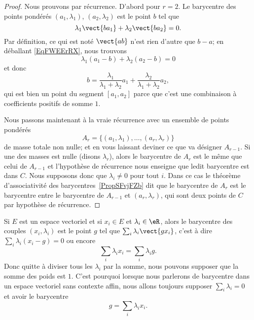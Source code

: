 \begin{proof}
    Nous prouvons par récurrence. D'abord pour \( r=2\). Le barycentre des points pondérés \( (a_1,\lambda_1)\), \( (a_2,\lambda_2)\) est le point \( b\) tel que
    \begin{equation}        \label{EqFWEErRX}
        \lambda_1\vect{ ba_1 }+\lambda_2\vect{ ba_2 }=0.
    \end{equation}
    Par définition, ce qui est noté \( \vect{ ab }\) n'est rien d'autre que \( b-a\); en déballant \eqref{EqFWEErRX}, nous trouvons
    \begin{equation}
        \lambda_1(a_1-b)+\lambda_2(a_2-b)=0
    \end{equation}
    et donc
    \begin{equation}
        b=\frac{ \lambda_1 }{ \lambda_1+\lambda_2 }a_1+\frac{ \lambda_2 }{ \lambda_1+\lambda_2 }a_2,
    \end{equation}
    qui est bien un point du segment \( [a_1,a_2]\) parce que c'est une combinaison à coefficients positifs de somme \( 1\).

    Nous passons maintenant à la vraie récurrence avec un ensemble de points pondérés
    \begin{equation}
        A_r=\{ (a_1,\lambda_1),\ldots, (a_r,\lambda_r) \}
    \end{equation}
    de masse totale non nulle; et en vous laissant deviner ce que va désigner \( A_{r-1}\). Si une des masses est nulle (disons \( \lambda_r\)), alors le barycentre de \( A_r\) est le même que celui de \( A_{r-1}\) et l'hypothèse de récurrence nous enseigne que ledit barycentre est dans \( C\). Nous supposons donc que \( \lambda_i\neq 0\) pour tout \( i\). Dans ce cas le théorème d'associativité des barycentres~\ref{PropSFvjFZb} dit que le barycentre de \( A_r\) est le barycentre entre le barycentre de \( A_{r-1}\) et \( (a_r,\lambda_r)\), qui sont deux points de \( C\) par hypothèse de récurrence.
\end{proof}

Si \( E\) est un espace vectoriel et si \( x_i\in E\) et \( \lambda_i\in \eR\), alors le barycentre des couples \( (x_i,\lambda_i)\) est le point \( g\) tel que \( \sum_i\lambda_i\vect{ gx_i }\), c'est à dire \( \sum_i\lambda_i(x_i-g)=0\) ou encore
\begin{equation}
    \sum_i\lambda_ix_i=\sum_i\lambda_ig.
\end{equation}
Donc quitte à diviser tous les \( \lambda_i\) par la somme, nous pouvons supposer que la somme des poids est \( 1\). C'est pourquoi lorsque nous parlerons de barycentre dans un espace vectoriel sans contexte affin, nous allons toujours supposer \( \sum_i\lambda_i=0\) et avoir le barycentre
\begin{equation}
    g=\sum_i\lambda_ix_i.
\end{equation}

